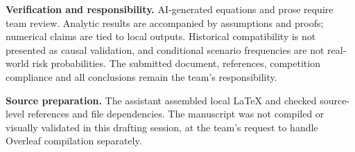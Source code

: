 \documentclass[12pt,a4paper]{article}
\theoremstyle{remark}
\begin{document}
\textbf{Verification and responsibility.} AI-generated equations and prose require team review. Analytic results are accompanied by assumptions and proofs; numerical claims are tied to local outputs. Historical compatibility is not presented as causal validation, and conditional scenario frequencies are not real-world risk probabilities. The submitted document, references, competition compliance and all conclusions remain the team's responsibility.

\textbf{Source preparation.} The assistant assembled local LaTeX and checked source-level references and file dependencies. The manuscript was not compiled or visually validated in this drafting session, at the team's request to handle Overleaf compilation separately.
\end{document}
